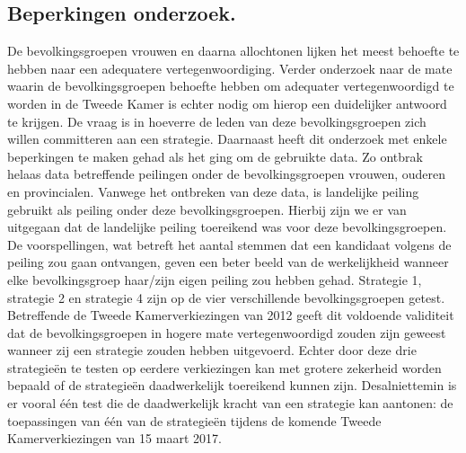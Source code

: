 \subsection{Beperkingen onderzoek.}
De bevolkingsgroepen vrouwen en daarna allochtonen lijken het meest behoefte te hebben naar een adequatere vertegenwoordiging. Verder onderzoek naar de mate waarin de bevolkingsgroepen behoefte hebben om adequater vertegenwoordigd te worden in de Tweede Kamer is echter nodig om hierop een duidelijker antwoord te krijgen. De vraag is in hoeverre de leden van deze bevolkingsgroepen zich willen committeren aan een strategie. Daarnaast heeft dit onderzoek met enkele beperkingen te maken gehad als het ging om de gebruikte data. Zo ontbrak helaas data betreffende peilingen onder de bevolkingsgroepen vrouwen, ouderen en provincialen. Vanwege het ontbreken van deze data, is landelijke peiling gebruikt als peiling onder deze bevolkingsgroepen. Hierbij zijn we er van uitgegaan dat de landelijke peiling toereikend was voor deze bevolkingsgroepen. De voorspellingen, wat betreft het aantal stemmen dat een kandidaat volgens de peiling zou gaan ontvangen, geven een beter beeld van de werkelijkheid wanneer elke bevolkingsgroep haar/zijn eigen peiling zou hebben gehad. Strategie 1, strategie 2 en strategie 4 zijn op de vier verschillende bevolkingsgroepen getest. Betreffende de Tweede Kamerverkiezingen van 2012 geeft dit voldoende validiteit dat de bevolkingsgroepen in hogere mate vertegenwoordigd zouden zijn geweest wanneer zij een strategie zouden hebben uitgevoerd. Echter door deze drie strategie\"{e}n te testen op eerdere verkiezingen kan met grotere zekerheid worden bepaald of de strategie\"{e}n daadwerkelijk toereikend kunnen zijn. Desalniettemin is er vooral één test die de daadwerkelijk kracht van een strategie kan aantonen: de toepassingen van één van de strategie\"{e}n tijdens de komende Tweede Kamerverkiezingen van 15 maart 2017.


